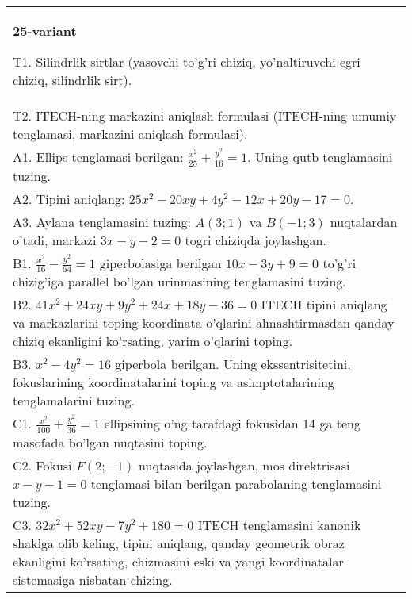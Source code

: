 \documentclass{article}
\begin{document}
\begin{tabular}{m{17cm}}
\textbf{25-variant}
\newline

T1. Silindrlik sirtlar (yasovchi to'g'ri chiziq, yo'naltiruvchi egri chiziq, silindrlik sirt).\\

T2. ITECH-ning markazini aniqlash formulasi (ITECH-ning umumiy tenglamasi, markazini aniqlash formulasi).\\

A1. Ellips tenglamasi berilgan: $\frac{x^2}{25}+\frac{y^2}{16}=1$. Uning qutb tenglamasini tuzing.\\

A2. Tipini aniqlang: $25x^{2}-20xy+4y^{2}-12x+20y-17=0$.\\

A3. Aylana tenglamasini tuzing: $A(3;1)$ va $B(-1;3)$ nuqtalardan o'tadi, markazi $3x-y-2=0$ togri chiziqda joylashgan.\\

B1. $\frac{x^{2}}{16} - \frac{y^{2}}{64} = 1$ giperbolasiga berilgan $10x - 3y + 9 = 0$ to'g'ri chizig'iga parallel bo'lgan urinmasining tenglamasini tuzing.  \\

B2. $41x^{2} + 24xy + 9y^{2} + 24x + 18y - 36 = 0$ ITECH tipini aniqlang va markazlarini toping koordinata o'qlarini almashtirmasdan qanday chiziq ekanligini ko'rsating, yarim o'qlarini toping.  \\

B3. $x^{2} - 4y^{2} = 16$ giperbola berilgan. Uning ekssentrisitetini, fokuslarining koordinatalarini toping va asimptotalarining tenglamalarini tuzing.\\

C1. $\frac{x^{2}}{100} + \frac{y^{2}}{36} = 1$ ellipsining o'ng tarafdagi fokusidan 14 ga teng masofada bo'lgan nuqtasini toping.  \\

C2. Fokusi $F(2; - 1)$ nuqtasida joylashgan, mos direktrisasi $x - y - 1 = 0$ tenglamasi bilan berilgan parabolaning tenglamasini tuzing.  \\

C3. $32x^{2} + 52xy - 7y^{2} + 180 = 0$ ITECH tenglamasini kanonik shaklga olib keling, tipini aniqlang, qanday geometrik obraz ekanligini ko'rsating, chizmasini eski va yangi koordinatalar sistemasiga nisbatan chizing.  \\

\end{tabular}
\vspace{1cm}
\end{document}
